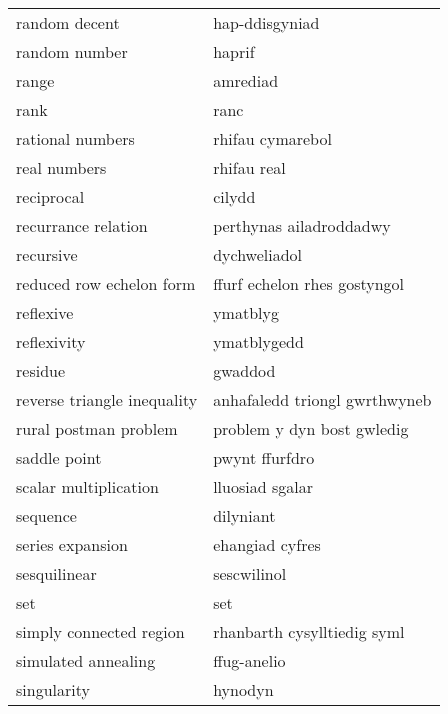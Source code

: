 \begin{supertabular}{p{0.22\textwidth}p{0.22\textwidth}}
                    random decent &                   hap-ddisgyniad \\
                    random number &                           haprif \\
                            range &                         amrediad \\
                             rank &                             ranc \\
                 rational numbers &                 rhifau cymarebol \\
                     real numbers &                      rhifau real \\
                       reciprocal &                           cilydd \\
              recurrance relation &          perthynas ailadroddadwy \\
                        recursive &                     dychweliadol \\
         reduced row echelon form &     ffurf echelon rhes gostyngol \\
                        reflexive &                         ymatblyg \\
                      reflexivity &                      ymatblygedd \\
                          residue &                          gwaddod \\
      reverse triangle inequality &    anhafaledd triongl gwrthwyneb \\
            rural postman problem &       problem y dyn bost gwledig \\
                     saddle point &                   pwynt ffurfdro \\
            scalar multiplication &                  lluosiad sgalar \\
                         sequence &                        dilyniant \\
                 series expansion &                  ehangiad cyfres \\
                     sesquilinear &                      sescwilinol \\
                              set &                              set \\
          simply connected region &      rhanbarth cysylltiedig syml \\
              simulated annealing &                      ffug-anelio \\
                      singularity &                          hynodyn \\

\end{supertabular}
